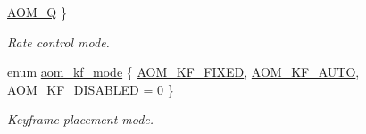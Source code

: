 \begin{DoxyCompactItemize}
\hyperlink{group__encoder_gga7c084d3ecef569aad166ce70b0e8a957aff3bbd4fe870b4b946c2093e59eb14e5}{A\+O\+M\+\_\+Q}
 \}\begin{DoxyCompactList}\small\item\em Rate control mode. \end{DoxyCompactList}
\item 
enum \hyperlink{group__encoder_gac0498fc02cd368e6d9675cdb0bab5a84}{aom\+\_\+kf\+\_\+mode} \{ \hyperlink{group__encoder_ggac0498fc02cd368e6d9675cdb0bab5a84a8d6f57a670b8bd8f11dae3e89acedb1d}{A\+O\+M\+\_\+\+K\+F\+\_\+\+F\+I\+X\+ED}, 
\hyperlink{group__encoder_ggac0498fc02cd368e6d9675cdb0bab5a84aea1965a235dea1b99d2b52145be35d4e}{A\+O\+M\+\_\+\+K\+F\+\_\+\+A\+U\+TO}, 
\hyperlink{group__encoder_ggac0498fc02cd368e6d9675cdb0bab5a84af81473ffe0169271763f9c9d05393405}{A\+O\+M\+\_\+\+K\+F\+\_\+\+D\+I\+S\+A\+B\+L\+ED} = 0
 \}\begin{DoxyCompactList}\small\item\em Keyframe placement mode. \end{DoxyCompactList}
\end{DoxyCompactItemize}
